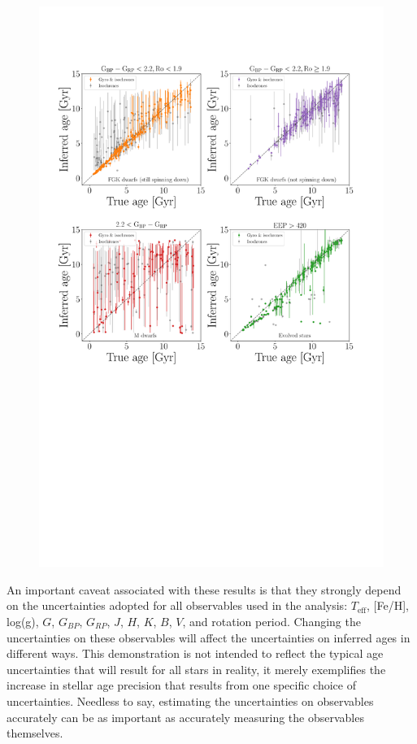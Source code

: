 \documentclass[useAMS, usenatbib, preprint, 12pt]{aastex}
\newcommand{\teff}{$T_{\mathrm{eff}}$}
\newcommand{\feh}{[Fe/H]}
\newcommand{\logg}{log(g)}
\begin{document}
\begin{figure}
    \includegraphics[width=1\textwidth]{simulation_results}
\label{fig:simulation_results}
\end{figure}

An important caveat associated with these results is that they strongly depend
on the uncertainties adopted for all observables used in the analysis: \teff,
\feh, \logg, $G$, $G_{BP}$, $G_{RP}$, $J$, $H$, $K$, $B$, $V$, and rotation
period.
Changing the uncertainties on these observables will affect the uncertainties
on inferred ages in different ways.
This demonstration is not intended to reflect the typical age uncertainties
that will result for all stars in reality, it merely exemplifies the increase
in stellar age precision that results from one specific choice of
uncertainties.
Needless to say, estimating the uncertainties on observables accurately can be
as important as accurately measuring the observables themselves.
\end{document}
